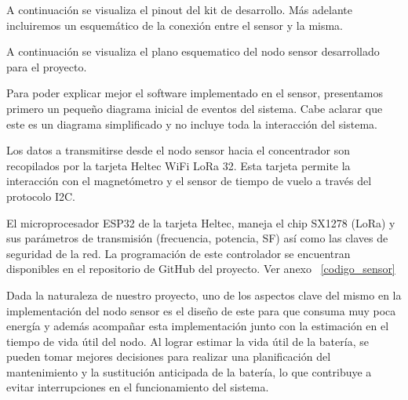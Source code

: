 A continuación se visualiza el pinout del kit de desarrollo. Más adelante incluiremos un
esquemático de la conexión entre el sensor y la misma.



A continuación se visualiza el plano esquematico del nodo sensor desarrollado para el proyecto.

Para poder explicar mejor el software implementado en el sensor, presentamos primero un
pequeño diagrama inicial de eventos del sistema. Cabe aclarar que este es un diagrama
simplificado y no incluye toda la interacción del sistema.


Los datos a transmitirse desde el nodo sensor hacia el concentrador son recopilados por
la tarjeta Heltec WiFi LoRa 32. Esta tarjeta permite la interacción con el magnetómetro
y el sensor de tiempo de vuelo a través del protocolo I2C.

El microprocesador ESP32 de la tarjeta Heltec, maneja el chip SX1278 (LoRa) y sus
parámetros de transmisión (frecuencia, potencia, SF) así como las claves de seguridad de
la red. La programación de este controlador se encuentran disponibles en el repositorio
de GitHub del proyecto. Ver anexo ~\ref{codigo_sensor}


Dada la naturaleza de nuestro proyecto, uno de los aspectos clave del mismo en la
implementación del nodo sensor es el diseño de este para que consuma muy poca energía y
además acompañar esta implementación junto con la estimación en el tiempo de vida útil
del nodo.
Al lograr estimar la vida útil de la batería, se pueden tomar mejores decisiones para
realizar una planificación del mantenimiento y la sustitución anticipada de la batería,
lo que contribuye a evitar interrupciones en el funcionamiento del sistema.

